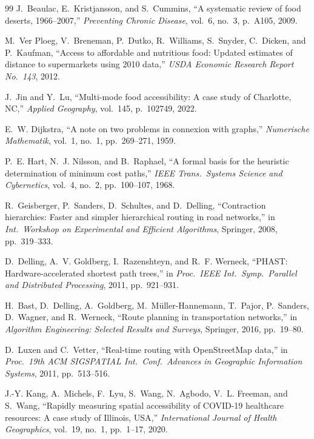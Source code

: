 \documentclass[conference]{IEEEtran}
\begin{document}
\begin{thebibliography}{99}
J.~Beaulac, E.~Kristjansson, and S.~Cummins, ``A systematic review of
food deserts, 1966--2007,'' \textit{Preventing Chronic Disease},
vol.~6, no.~3, p.~A105, 2009.

M.~Ver Ploeg, V.~Breneman, P.~Dutko, R.~Williams, S.~Snyder,
C.~Dicken, and P.~Kaufman, ``Access to affordable and nutritious food:
Updated estimates of distance to supermarkets using 2010 data,''
\textit{USDA Economic Research Report No.~143}, 2012.

J.~Jin and Y.~Lu, ``Multi-mode food accessibility: A case study of
Charlotte, NC,'' \textit{Applied Geography}, vol.~145, p.~102749,
2022.

E.~W. Dijkstra, ``A note on two problems in connexion with graphs,''
\textit{Numerische Mathematik}, vol.~1, no.~1, pp.~269--271, 1959.

P.~E. Hart, N.~J. Nilsson, and B.~Raphael, ``A formal basis for the
heuristic determination of minimum cost paths,'' \textit{IEEE Trans.\
Systems Science and Cybernetics}, vol.~4, no.~2, pp.~100--107, 1968.

R.~Geisberger, P.~Sanders, D.~Schultes, and D.~Delling, ``Contraction
hierarchies: Faster and simpler hierarchical routing in road
networks,'' in \textit{Int.\ Workshop on Experimental and Efficient
Algorithms}, Springer, 2008, pp.~319--333.

D.~Delling, A.~V. Goldberg, I.~Razenshteyn, and R.~F. Werneck,
``PHAST: Hardware-accelerated shortest path trees,'' in \textit{Proc.\
IEEE Int.\ Symp.\ Parallel and Distributed Processing}, 2011,
pp.~921--931.

H.~Bast, D.~Delling, A.~Goldberg, M.~M\"{u}ller-Hannemann, T.~Pajor,
P.~Sanders, D.~Wagner, and R.~Werneck, ``Route planning in
transportation networks,'' in \textit{Algorithm Engineering: Selected
Results and Surveys}, Springer, 2016, pp.~19--80.

D.~Luxen and C.~Vetter, ``Real-time routing with OpenStreetMap
data,'' in \textit{Proc.\ 19th ACM SIGSPATIAL Int.\ Conf.\ Advances
in Geographic Information Systems}, 2011, pp.~513--516.

J.-Y. Kang, A.~Michels, F.~Lyu, S.~Wang, N.~Agbodo, V.~L. Freeman,
and S.~Wang, ``Rapidly measuring spatial accessibility of COVID-19
healthcare resources: A case study of Illinois, USA,''
\textit{International Journal of Health Geographics}, vol.~19, no.~1,
pp.~1--17, 2020.


\end{thebibliography}
\end{document}
